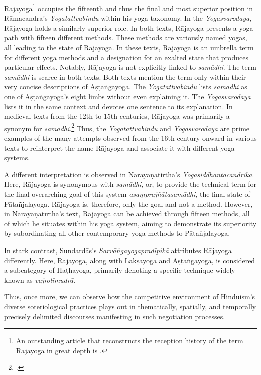 Rājayoga\footnote{An outstanding article that reconstructs the reception history of the term Rājayoga in great depth is \cite{birch2014}.} occupies the fifteenth and thus the final and most superior position in Rāmacandra's \emph{Yogatattvabindu} within his yoga taxonomy. In the \textit{Yogasvarodaya}, Rājayoga holds a similarly superior role. In both texts, Rājayoga presents a yoga path with fifteen different methods. These methods are variously named yogas, all leading to the state of Rājayoga. In these texts, Rājayoga is an umbrella term for different yoga methods and a designation for an exalted state that produces particular effects. Notably, Rājayoga is not explicitly linked to \textit{samādhi}. The term \textit{samādhi} is scarce in both texts. Both texts mention the term only within their very concise descriptions of Aṣṭāṅgayoga. The \emph{Yogatattvabindu} lists \textit{samādhi} as one of Aṣṭaṅgayoga's eight limbs without even explaining it. The \textit{Yogasvarodaya} lists it in the same context and devotes one sentence to its explanation. In medieval texts from the 12th to 15th centuries, Rājayoga was primarily a synonym for \textit{samādhi}.\footnote{\citeauthor[2014: 401]{birch2014}.} Thus, the \emph{Yogatattvabindu} and \emph{Yogasvarodaya} are prime examples of the many attempts observed from the 16th century onward in various texts to reinterpret the name Rājayoga and associate it with different yoga systems.

A different interpretation is observed in Nārāyaṇatirtha's \textit{Yogasiddhāntacandrikā}. Here, Rājayoga is synonymous with \textit{samādhi}, or, to provide the technical term for the final overarching goal of this system \textit{asaṃprajñātasamādhi}, the final state of Pātañjalayoga. Rājayoga is, therefore, only the goal and not a method. However, in Nārāyaṇatīrtha's text, Rājayoga can be achieved through fifteen methods, all of which he situates within his yoga system, aiming to demonstrate its superiority by subordinating all other contemporary yoga methods to Pātañjalayoga.

In stark contrast, Sundardās’s \emph{Sarvāṅgayogapradīpikā} attributes Rājayoga differently. Here, Rājayoga, along with Lakṣayoga and Aṣṭāṅgayoga, is considered a subcategory of Haṭhayoga, primarily denoting a specific technique widely known as \textit{vajrolīmudrā}.

Thus, once more, we can observe how the competitive environment of Hinduism’s diverse soteriological practices plays out in thematically, spatially, and temporally precisely delimited discourses manifesting in such negotiation processes. 

